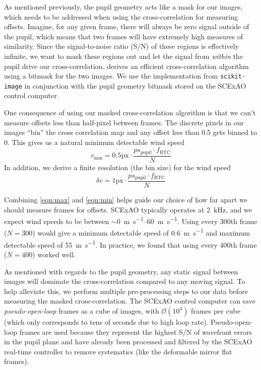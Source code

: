 As mentioned previously, the pupil geometry acts like a mask for our images, which needs to be addressed when using the cross-correlation for measuring offsets. Imagine, for any given frame, there will always be zero signal outside of the pupil, which means that two frames will have extremely high measures of similarity. Since the signal-to-noise ratio (S/N) of these regions is effectively infinite, we want to mask these regions out and let the signal from \textit{within} the pupil drive our cross-correlation. \citet{2012ITIP...21.2706P} derives an efficient cross-correlation algorithm using a bitmask for the two images. We use the implementation from \verb|scikit-image| \citep{2014arXiv1407.6245V} in conjunction with the pupil geometry bitmask stored on the SCExAO control computer.

One consequence of using our masked cross-correlation algorithm is that we can't measure offsets less than half-pixel between frames. The discrete pixels in our images ``bin'' the cross correlation map and any offset less than \SI{0.5}{\pixel} gets binned to \SI{0}{\pixel}. This gives us a natural minimum detectable wind speed
\begin{equation}
    v_{\min} = 0.5\mathrm{ px}\cdot\frac{ps_\mathrm{pupil} \cdot f_\mathrm{RTC}}{N}
    \label{eqn:min}
\end{equation}
In addition, we derive a finite resolution (the bin size) for the wind speed
\begin{equation}
    \delta v = 1\mathrm{ px} \cdot\frac{ps_\mathrm{pupil} \cdot f_\mathrm{RTC}}{N}
    \label{eqn:resolution}
\end{equation}

Combining \autoref{eqn:max} and \autoref{eqn:min} helps guide our choice of how far apart we should measure frames for offsets. SCExAO typically operates at \SI{2}{\kilo\hertz}, and we expect wind speeds to be between $\sim$\SIrange{0}{60}{\meter\per\second}. Using every 300th frame ($N=300$) would give a minimum detectable speed of \SI{0.6}{\meter\per\second} and maximum detectable speed of \SI{55}{\meter\per\second}. In practice, we found that using every 400th frame ($N=400$) worked well.

As mentioned with regards to the pupil geometry, any static signal between images will dominate the cross-correlation compared to any moving signal. To help alleviate this, we perform multiple pre-processing steps to our data before measuring the masked cross-correlation. The SCExAO control computer can save \textit{pseudo-open-loop} frames as a cube of images, with $\mathcal{O}(10^4)$ frames per cube (which only corresponds to tens of seconds due to high loop rate). Pseudo-open-loop frames are used because they represent the highest S/N of wavefront errors in the pupil plane and have already been processed and filtered by the SCExAO real-time controller to remove systematics (like the deformable mirror flat frames).


